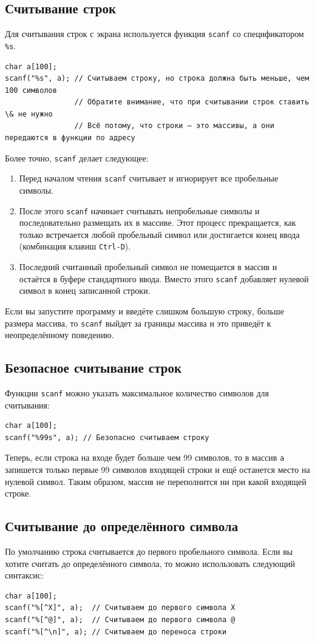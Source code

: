 \documentclass[10pt]{article}
\begin{document}
\subsection*{Считывание строк}
Для считывания строк с экрана используется функция \texttt{scanf} со спецификатором \texttt{\%s}. 
\begin{lstlisting}
char a[100];
scanf("%s", a); // Считываем строку, но строка должна быть меньше, чем 100 символов
                // Обратите внимание, что при считывании строк ставить \& не нужно
                // Всё потому, что строки — это массивы, а они передаются в функции по адресу
\end{lstlisting}
Более точно, \texttt{scanf} делает следующее:
\begin{enumerate}
\item Перед началом чтения \texttt{scanf} считывает и игнорирует все пробельные символы.
\item После этого \texttt{scanf} начинает считывать непробельные символы и последовательно размещать их в массиве. Этот процесс прекращается, как только встречается любой пробельный символ или достигается конец ввода (комбинация клавиш \texttt{Ctrl-D}).
\item Последний считанный пробельный символ не помещается в массив и остаётся в буфере стандартного ввода. Вместо этого \texttt{scanf} добавляет нулевой символ в конец записанной строки.
\end{enumerate}
Если вы запустите программу и введёте слишком большую строку, больше размера массива, то \texttt{scanf} выйдет за границы массива и это приведёт к неопределённому поведению.

\subsection*{Безопасное считывание строк}
Функции \texttt{scanf} можно указать максимальное количество символов для считывания:
\begin{lstlisting}
char a[100];
scanf("%99s", a); // Безопасно считываем строку
\end{lstlisting}
Теперь, если строка на входе будет больше чем 99 символов, то в массив \texttt{a} запишется только первые 99 символов входящей строки и ещё останется место на нулевой символ. Таким образом, массив не переполнится ни при какой входящей строке.

\subsection*{Считывание до определённого символа}
По умолчанию строка считывается до первого пробельного символа. Если вы хотите считать до определённого символа, то можно использовать следующий синтаксис:
\begin{lstlisting}
char a[100];
scanf("%[^X]", a);  // Считываем до первого символа X
scanf("%[^@]", a);  // Считываем до первого символа @
scanf("%[^\n]", a); // Считываем до переноса строки
\end{lstlisting}
\end{document}
